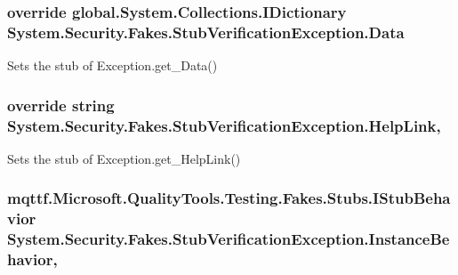 \hypertarget{class_system_1_1_security_1_1_fakes_1_1_stub_verification_exception_a8329f4105e7b5876b3da06be19f5190b}{
\subsubsection[{Data}]{\setlength{\rightskip}{0pt plus 5cm}override global.\-System.\-Collections.\-I\-Dictionary System.\-Security.\-Fakes.\-Stub\-Verification\-Exception.\-Data\hspace{0.3cm}{\ttfamily [get]}}}\label{class_system_1_1_security_1_1_fakes_1_1_stub_verification_exception_a8329f4105e7b5876b3da06be19f5190b}


Sets the stub of Exception.\-get\-\_\-\-Data()

\hypertarget{class_system_1_1_security_1_1_fakes_1_1_stub_verification_exception_a92f3df1938bccaaecc3ec6aa4e5f5391}{
\subsubsection[{Help\-Link}]{\setlength{\rightskip}{0pt plus 5cm}override string System.\-Security.\-Fakes.\-Stub\-Verification\-Exception.\-Help\-Link\hspace{0.3cm}{\ttfamily [get]}, {\ttfamily [set]}}}\label{class_system_1_1_security_1_1_fakes_1_1_stub_verification_exception_a92f3df1938bccaaecc3ec6aa4e5f5391}


Sets the stub of Exception.\-get\-\_\-\-Help\-Link()

\hypertarget{class_system_1_1_security_1_1_fakes_1_1_stub_verification_exception_a372c0a18335c0642bbaad51a5c0e60cc}{
\subsubsection[{Instance\-Behavior}]{\setlength{\rightskip}{0pt plus 5cm}mqttf.\-Microsoft.\-Quality\-Tools.\-Testing.\-Fakes.\-Stubs.\-I\-Stub\-Behavior System.\-Security.\-Fakes.\-Stub\-Verification\-Exception.\-Instance\-Behavior\hspace{0.3cm}{\ttfamily [get]}, {\ttfamily [set]}}}\label{class_system_1_1_security_1_1_fakes_1_1_stub_verification_exception_a372c0a18335c0642bbaad51a5c0e60cc}


